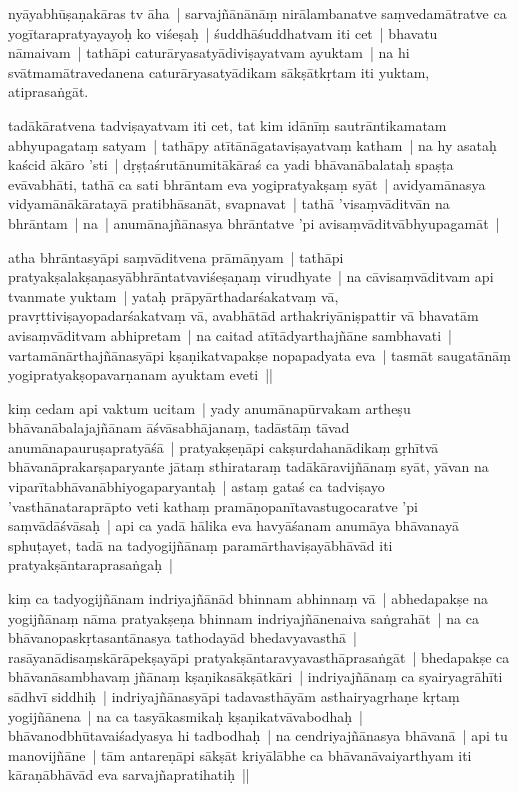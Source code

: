 \documentclass[article,a4paper]{memoir}
\begin{document}
	  \pstart nyā\-yabhū\-ṣaṇakā\-ras tv ā\-ha | sarvajñā\-nā\-nā\-ṃ nirā\-lambanatve saṃvedamā\-tratve ca yogī\-tarapratyayayoḥ ko viśeṣaḥ | śuddhā\-śuddhatvam iti cet | bhavatu nā\-maivam | tathā\-pi caturā\-ryasatyā\-diviṣayatvam ayuktam | na hi svā\-tmamā\-travedanena caturā\-ryasatyā\-dikam sā\-kṣā\-tkṛtam iti yuktam, atiprasaṅgā\-t. 
	\pend
      

	  \pstart tadā\-kā\-ratvena tadviṣayatvam iti cet, tat kim idā\-nī\-ṃ sautrā\-ntikamatam abhyupagataṃ satyam | tathā\-py atī\-tā\-nā\-gataviṣayatvaṃ katham | na hy asataḥ kaścid ā\-kā\-ro 'sti | dṛṣṭaśrutā\-numitā\-kā\-raś ca yadi bhā\-vanā\-balataḥ spaṣṭa evā\-vabhā\-ti, tathā\- ca sati bhrā\-ntam eva yogipratyakṣaṃ syā\-t | avidyamā\-nasya vidyamā\-nā\-kā\-ratayā\- pratibhā\-sanā\-t, svapnavat | tathā\- 'visaṃvā\-ditvā\-n na bhrā\-ntam | na | anumā\-najñā\-nasya bhrā\-ntatve 'pi avisaṃvā\-ditvā\-bhyupagamā\-t | 
	\pend
      

	  \pstart atha bhrā\-ntasyā\-pi saṃvā\-ditvena prā\-mā\-ṇyam | tathā\-pi pratyakṣalakṣaṇasyā\-bhrā\-ntatvaviśeṣaṇaṃ virudhyate | na cā\-visaṃvā\-ditvam api tvanmate yuktam | yataḥ prā\-pyā\-rthadarśakatvaṃ vā\-, pravṛttiviṣayopadarśakatvaṃ vā\-, avabhā\-tā\-d arthakriyā\-niṣpattir vā\- bhavatā\-m avisaṃvā\-ditvam abhipretam | na caitad atī\-tā\-dyarthajñā\-ne sambhavati | vartamā\-nā\-rthajñā\-nasyā\-pi kṣaṇikatvapakṣe nopapadyata eva | tasmā\-t saugatā\-nā\-ṃ yogipratyakṣopavarṇanam ayuktam eveti || 
	\pend
      

	  \pstart kiṃ cedam api vaktum ucitam | yady anumā\-napū\-rvakam artheṣu bhā\-vanā\-balajajñā\-nam ā\-śvā\-sabhā\-janaṃ, tadā\-stā\-ṃ tā\-vad anumā\-napauruṣapratyā\-śā\- | pratyakṣeṇā\-pi cakṣurdahanā\-dikaṃ gṛhī\-tvā\- bhā\-vanā\-prakarṣaparyante jā\-taṃ sthirataraṃ tadā\-kā\-ravijñā\-naṃ syā\-t, yā\-van na viparī\-tabhā\-vanā\-bhiyogaparyantaḥ | astaṃ gataś ca tadviṣayo 'vasthā\-nataraprā\-pto veti kathaṃ pramā\-ṇopanī\-tavastugocaratve 'pi saṃvā\-dā\-śvā\-saḥ | api ca yadā\- hā\-lika eva havyā\-śanam anumā\-ya bhā\-vanayā\- sphuṭayet, tadā\- na tadyogijñā\-naṃ paramā\-rthaviṣayā\-bhā\-vā\-d iti pratyakṣā\-ntaraprasaṅgaḥ | 
	\pend
      

	  \pstart kiṃ ca tadyogijñā\-nam indriyajñā\-nā\-d bhinnam abhinnaṃ vā\- | abhedapakṣe na yogijñā\-naṃ nā\-ma pratyakṣeṇa bhinnam indriyajñā\-nenaiva saṅgrahā\-t | na ca bhā\-vanopaskṛtasantā\-nasya tathodayā\-d bhedavyavasthā\- | rasā\-yanā\-disaṃskā\-rā\-pekṣayā\-pi pratyakṣā\-ntaravyavasthā\-prasaṅgā\-t | bhedapakṣe ca bhā\-vanā\-sambhavaṃ jñā\-naṃ kṣaṇikasā\-kṣā\-tkā\-ri | indriyajñā\-naṃ ca syairyagrā\-hī\-ti sā\-dhvī\- siddhiḥ | indriyajñā\-nasyā\-pi tadavasthā\-yā\-m asthairyagrhaṇe kṛtaṃ yogijñā\-nena | na ca tasyā\-kasmikaḥ kṣaṇikatvā\-vabodhaḥ | bhā\-vanodbhū\-tavaiśadyasya hi tadbodhaḥ | na cendriyajñā\-nasya bhā\-vanā\- | api tu manovijñā\-ne | tā\-m antareṇā\-pi sā\-kṣā\-t kriyā\-lā\-bhe ca bhā\-vanā\-vaiyarthyam iti kā\-raṇā\-bhā\-vā\-d eva sarvajñapratihatiḥ || 
	\pend
      
\end{document}
